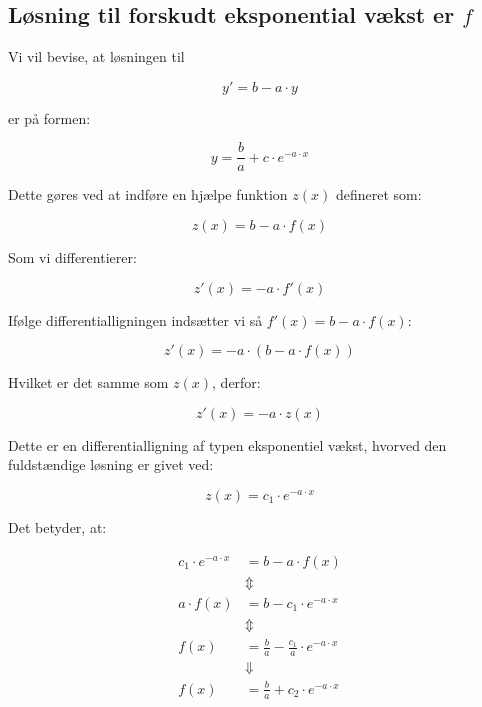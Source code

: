 \documentclass{article}
\makeatletter
\newenvironment{proofw}{\par
  \pushQED{\qed}%
  \normalfont \topsep6\p@\@plus6\p@\relax
  \trivlist
  \item[]\ignorespaces
}{%
  \popQED\endtrivlist\@endpefalse
}
\makeatother
\begin{document}
\subsection{Løsning til forskudt eksponential vækst er $f$}

\begin{proofw}
    
Vi vil bevise, at løsningen til 

$$y'=b-a\cdot y$$

er på formen:

$$
    y=\frac{b}{a}+c\cdot e^{-a \cdot x}
$$

Dette gøres ved at indføre en hjælpe funktion $z(x)$ defineret som:

$$
    z(x)=b-a\cdot f(x)
$$

Som vi differentierer:

$$
    z'(x)=-a\cdot f'(x)
$$

Ifølge differentialligningen indsætter vi så $f'(x)=b-a\cdot f(x)$:

$$
    z'(x)=-a\cdot (b-a \cdot f(x))
$$

Hvilket er det samme som $z(x)$, derfor:

$$
    z'(x)=-a\cdot z(x)
$$

Dette er en differentialligning af typen eksponentiel vækst,
hvorved den fuldstændige løsning er givet ved:

$$
    z(x)=c_1\cdot e^{-a\cdot x}
$$

Det betyder, at:

\begin{align*}
    c_1\cdot e^{-a\cdot x}&=b-a\cdot f(x)
    \\
    &\Updownarrow
    \\
    a\cdot f(x)&=b-c_1\cdot e^{-a\cdot x}
     \\
    &\Updownarrow
    \\
    f(x)&=\frac{b}{a}-\frac{c_1}{a}\cdot e^{-a\cdot x}
    \\
    &\Downarrow
    \\
    f(x)&=\frac{b}{a}+c_2\cdot e^{-a\cdot x}
\end{align*}

\end{proofw}
\end{document}
